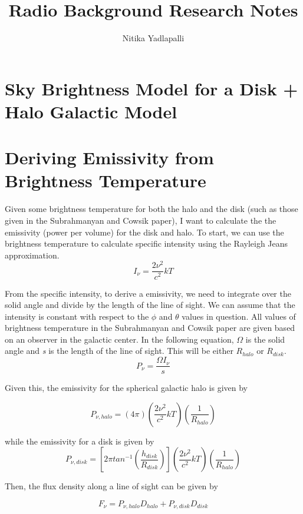 \documentclass[letterpaper, 10pt]{article}
\title{Radio Background Research Notes}
\author{Nitika Yadlapalli}
\date{}
\begin{document}
\maketitle

\section{Sky Brightness Model for a Disk + Halo Galactic Model}

\section{Deriving Emissivity from Brightness Temperature}
Given some brightness temperature for both the halo and the disk (such as those given in the Subrahmanyan and Cowsik paper), I want to calculate the the emissivity (power per volume) for the disk and halo. To start, we can use the brightness temperature to calculate specific intensity using the Rayleigh Jeans approximation. 
\[ I_{\nu} = \frac{2\nu^{2}}{c^{2}}kT \]

From the specific intensity, to derive a emissivity, we need to integrate over the solid angle and divide by the length of the line of sight. We can assume that the intensity is constant with respect to the $\phi$ and $\theta$ values in question. All values of brightness temperature in the Subrahmanyan and Cowsik paper are given based on an observer in the galactic center. In the following equation, $\Omega$ is the solid angle and \emph{s} is the length of the line of sight. This will be either $R_{halo}$ or $R_{disk}$.
\[ P_{\nu} = \frac{\Omega I_{\nu}}{s} \]

Given this, the emissivity for the spherical galactic halo is given by 

\[P_{\nu, halo} = (4\pi)\left(\frac{2\nu^{2}}{c^{2}}kT\right)\left(\frac{1}{R_{halo}}\right)\]

while the emissivity for a disk is given by 
\[P_{\nu, disk} = \left[ 2\pi tan^{-1}\left(\frac{h_{disk}}{R_{disk}}\right) \right]\left(\frac{2\nu^{2}}{c^{2}}kT\right)\left(\frac{1}{R_{halo}}\right)\]

Then, the flux density along a line of sight can be given by 

\[F_{\nu} = P_{\nu, halo}D_{halo} + P_{\nu, disk}D_{disk} \]
\end{document}
